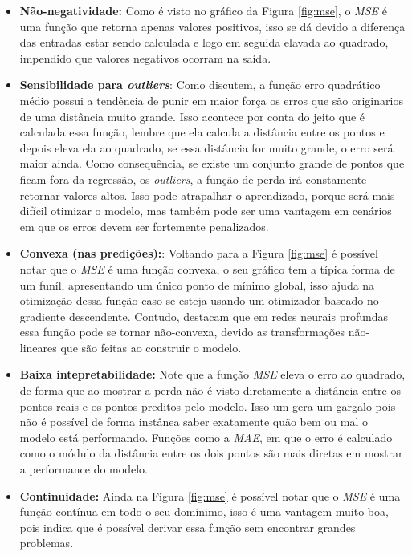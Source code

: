 \begin{itemize}
    \item \textbf{Não-negatividade:} Como é visto no gráfico da Figura \ref{fig:mse}, o \textit{MSE} é uma função que retorna apenas valores positivos, isso se dá devido a diferença das entradas estar sendo calculada e logo em seguida elavada ao quadrado, impendido que valores negativos ocorram na saída.
    \item \textbf{Sensibilidade para \textit{outliers}}: Como \textcite{LossesArticle} discutem, a função erro quadrático médio possui a tendência de punir em maior força os erros que são originarios de uma distância muito grande. Isso acontece por conta do jeito que é calculada essa função, lembre que ela calcula a distância entre os pontos e depois eleva ela ao quadrado, se essa distância for muito grande, o erro será maior ainda. Como consequência, se existe um conjunto grande de pontos que ficam fora da regressão, os \textit{outliers}, a função de perda irá constamente retornar valores altos. Isso pode atrapalhar o aprendizado, porque será mais difícil otimizar o modelo, mas também pode ser uma vantagem em cenários em que os erros devem ser fortemente penalizados.
    \item \textbf{Convexa (nas predições):}: Voltando para a Figura \ref{fig:mse} é possível notar que o \textit{MSE} é uma função convexa, o seu gráfico tem a típica forma de um funíl, apresentando um único ponto de mínimo global, isso ajuda na otimização dessa função caso se esteja usando um otimizador baseado no gradiente descendente. Contudo, \textcite{LossesArticle} destacam que em redes neurais profundas essa função pode se tornar não-convexa, devido as transformações não-lineares que são feitas ao construir o modelo.
    \item \textbf{Baixa intepretabilidade:} Note que a função \textit{MSE} eleva o erro ao quadrado, de forma que ao mostrar a perda não é visto diretamente a distância entre os pontos reais e os pontos preditos pelo modelo. Isso um gera um gargalo pois não é possível de forma instânea saber exatamente quão bem ou mal o modelo está performando. Funções como a \textit{MAE}, em que o erro é calculado como o módulo da distância entre os dois pontos são mais diretas em mostrar a performance do modelo.
    \item \textbf{Continuidade:} Ainda na Figura \ref{fig:mse} é possível notar que o \textit{MSE} é uma função contínua em todo o seu domínimo, isso é uma vantagem muito boa, pois indica que é possível derivar essa função sem encontrar grandes problemas.
\end{itemize}

